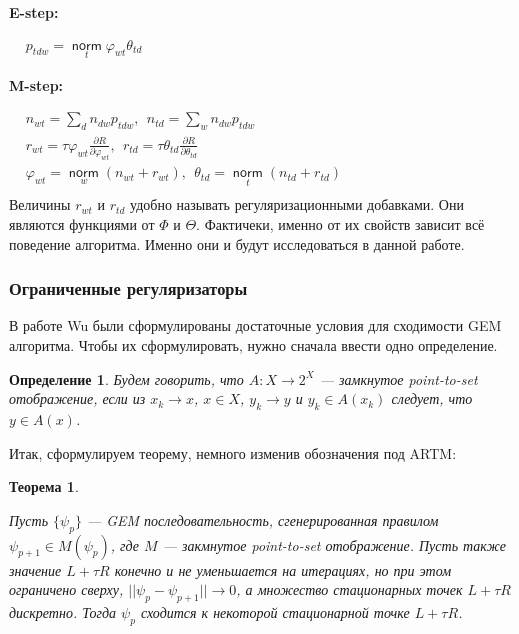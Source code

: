 \documentclass[12pt]{article}
\newtheorem{definition}{Определение}[section]
\newtheorem{theorem}{Теорема}
\renewcommand{\phi}{\varphi}
\newcommand{\norm}{\mathop{\mathsf{norm}}\limits}
\begin{document}
\textbf{E-step:}   
 
$
\begin{aligned}
& p_{tdw} = \norm_t \phi_{wt} \theta_{td}
\end{aligned}
$\medskip

\textbf{M-step:}

$
\begin{aligned}
& n_{wt} = \sum\limits_{d} n_{dw} p_{tdw},~~n_{td} = \sum\limits_{w} n_{dw} p_{tdw}\\    
& r_{wt} =  \tau \phi_{wt}\frac{\partial R}{\partial\phi_{wt}},~~ r_{td} =  \tau \theta_{td}\frac{\partial R}{\partial\theta_{td}}\\
& \phi_{wt}  = \norm_w \left(n_{wt} + r_{wt} \right),~~\theta_{td} = \norm_t  \left(n_{td} + r_{td}\right)\\
\end{aligned}
$\medskip\\
Величины $r_{wt}$ и $r_{td}$ удобно называть регуляризационными добавками. Они являются функциями от $\Phi$ и $\Theta$. Фактичеки, именно от их свойств зависит всё поведение алгоритма. Именно они и будут исследоваться в данной работе.


	\subsubsection{Ограниченные регуляризаторы}
	 В работе Wu \cite{wu1983convergence} были сформулированы достаточные условия для сходимости GEM алгоритма. Чтобы их сформулировать, нужно сначала ввести одно определение.
	\begin{definition}
	Будем говорить, что $A\colon X \to 2^X$ --- замкнутое point-to-set отображение, если из $x_k \to x$, $x \in X$, $y_k \to y$ и $y_k \in A(x_k)$ следует, что $y \in A(x)$.
	\end{definition}

	Итак, сформулируем теорему, немного изменив обозначения под ARTM:
	\begin{theorem} \label{theorem_wu} 

	Пусть $\{\psi_p\}$ --- GEM последовательность, сгенерированная правилом $\psi_{p+1} \in M(\psi_p)$, где $M$ --- закмнутое point-to-set отображение. Пусть также значение $L + \tau R$ конечно и не уменьшается на итерациях, но при этом ограничено сверху, $|| \psi_p - \psi_{p+1}|| \to 0$, а множество стационарных точек $L + \tau R$ дискретно. Тогда $\psi_p$ сходится к некоторой стационарной точке $L + \tau R$.
	\end{theorem}
\end{document}
